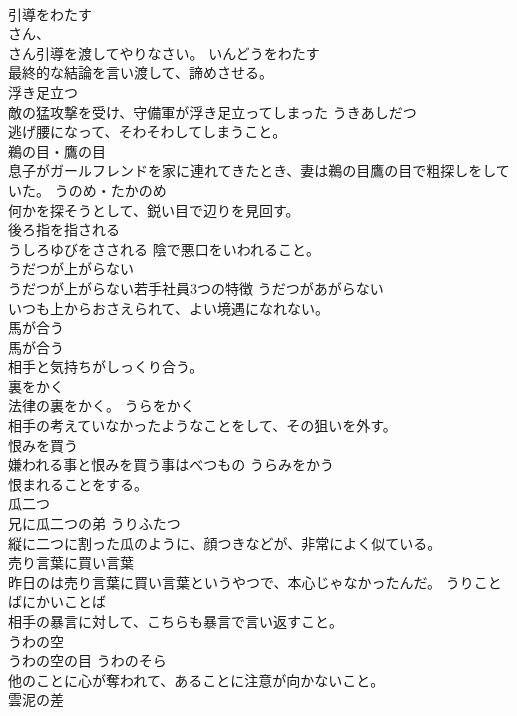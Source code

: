 \documentclass[8pt]{extreport}
\begin{document}
\begin{CJK}{UTF8}{min}
\\	引導をわたす	
\\	さん、
\\	さん引導を渡してやりなさい。	いんどうをわたす		
\\	最終的な結論を言い渡して、諦めさせる。
\\	浮き足立つ	
\\	敵の猛攻撃を受け、守備軍が浮き足立ってしまった	うきあしだつ	
\\	逃げ腰になって、そわそわしてしまうこと。
\\	鵜の目・鷹の目	
\\	息子がガールフレンドを家に連れてきたとき、妻は鵜の目鷹の目で粗探しをしていた。	うのめ・たかのめ	
\\	何かを探そうとして、鋭い目で辺りを見回す。
\\	後ろ指を指される	
\\	うしろゆびをさされる			陰で悪口をいわれること。
\\	うだつが上がらない	
\\	うだつが上がらない若手社員3つの特徴	うだつがあがらない		
\\	いつも上からおさえられて、よい境遇になれない。
\\	馬が合う	
\\	馬が合う	
\\	相手と気持ちがしっくり合う。
\\	裏をかく	
\\	法律の裏をかく。	うらをかく	
\\	相手の考えていなかったようなことをして、その狙いを外す。
\\	恨みを買う	
\\	嫌われる事と恨みを買う事はべつもの	うらみをかう	
\\	恨まれることをする。
\\	瓜二つ	
\\	兄に瓜二つの弟	うりふたつ	
\\	縦に二つに割った瓜のように、顔つきなどが、非常によく似ている。
\\	売り言葉に買い言葉	
\\	昨日のは売り言葉に買い言葉というやつで、本心じゃなかったんだ。	うりことばにかいことば		
\\	相手の暴言に対して、こちらも暴言で言い返すこと。
\\	うわの空	
\\	うわの空の目	うわのそら	
\\	他のことに心が奪われて、あることに注意が向かないこと。
\\	雲泥の差	

\end{CJK}
\end{document}
